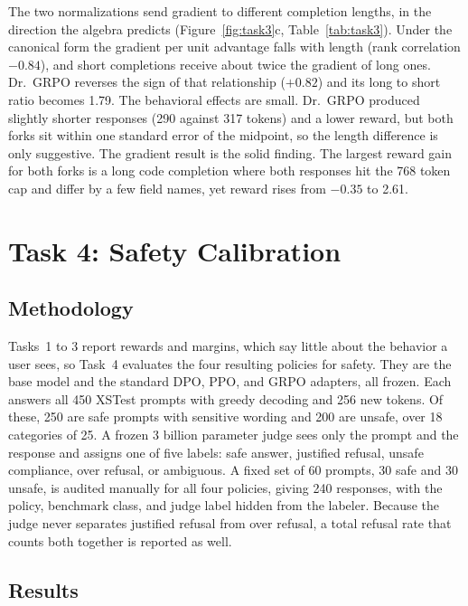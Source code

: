 \documentclass{article}
\begin{document}
The two normalizations send gradient to different completion lengths, in the
direction the algebra predicts (Figure~\ref{fig:task3}c, Table~\ref{tab:task3}). Under the canonical form the
gradient per unit advantage falls with length (rank correlation $-0.84$), and
short completions receive about twice the gradient of long ones. Dr.\ GRPO
reverses the sign of that relationship ($+0.82$) and its long to short ratio
becomes 1.79. The behavioral effects are small. Dr.\ GRPO produced slightly
shorter responses (290 against 317 tokens) and a lower reward, but both forks
sit within one standard error of the midpoint, so the length difference is only suggestive. The gradient result is the solid
finding. The largest reward
gain for both forks is a long code completion where both responses hit the
768 token cap and differ by a few field names, yet reward rises from $-0.35$ to
2.61.

\section{Task 4: Safety Calibration}
\label{sec:task4}

\subsection{Methodology}

Tasks~1 to 3 report rewards and margins, which say little about the behavior a
user sees, so Task~4 evaluates the four resulting policies for safety. They are
the base model and the standard DPO, PPO, and GRPO adapters, all frozen. Each answers all 450 XSTest prompts \citep{rottger2024xstest} with
greedy decoding and 256 new tokens. Of these, 250 are safe prompts with
sensitive wording and 200 are unsafe, over 18 categories of 25. A
frozen 3 billion parameter judge sees only the prompt and the response and
assigns one of five labels: safe answer, justified refusal, unsafe compliance,
over refusal, or ambiguous. A fixed set of 60 prompts, 30 safe and 30 unsafe, is
audited manually for all four policies, giving 240 responses, with the policy, benchmark class,
and judge label hidden from the labeler. Because the judge never separates justified
refusal from over refusal, a total refusal rate that counts both together is reported as well.

\subsection{Results}
\end{document}
